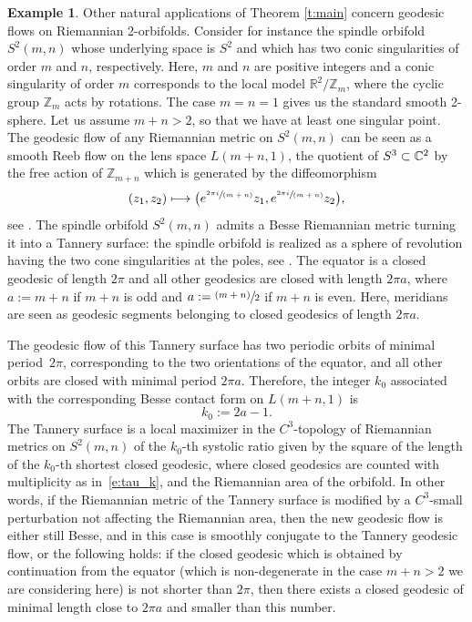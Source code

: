 \documentclass[JEP,XML,SOM,Unicode,published]{cedram}
\let\mathds\mathbb
\newcommand{\psfrac}[2]{\sfrac{(#1)}{#2}}
\newcommand{\spfrac}[2]{\sfrac{#1}{(#2)}}
\newcommand\mto{\mathchoice{\longmapsto}{\mapsto}{\mapsto}{\mapsto}}
\theoremstyle{definition}
\newtheorem{exm}[thm]{Example}
\newcommand{\Z}{\mathds{Z}}
\newcommand{\R}{\mathds{R}}
\begin{document}
\begin{exm}\label{exm:besse_spindle}
Other natural applications of Theorem \ref{t:main} concern geodesic flows on Riemannian 2-orbifolds. Consider for instance the spindle orbifold $S^2(m,n)$ whose underlying space is $S^2$ and which has two conic singularities of order $m$ and $n$, respectively. Here, $m$ and $n$ are positive integers and a conic singularity of order $m$ corresponds to the local model $\R^2/\Z_m$, where the cyclic group $\Z_m$ acts by rotations. The case $m=n=1$ gives us the standard smooth 2-sphere. Let us assume $m+n>2$, so that we have at least one singular point. The geodesic flow of any Riemannian metric on $S^2(m,n)$ can be seen as a smooth Reeb flow on the lens space $L(m+n,1)$, \ie the quotient of $S^3\subset \C^2$ by the free action of $\Z_{m+n}$ which is generated by the diffeomorphism
\[
(z_1,z_2) \mto \bigl( e^{\spfrac{2\pi i}{m+n}} z_1, e^{\spfrac{2\pi i}{m+n}} z_2 \bigr),
\]
see \cite{Lange:2020}. The spindle orbifold $S^2(m,n)$ admits a Besse Riemannian metric turning it into a Tannery surface: the spindle orbifold is realized as a sphere of revolution having the two cone singularities at the poles, see \cite[Chap.\,4]{Besse:1978pr}. The equator is a closed geodesic of length $2\pi$ and all other geodesics are closed with length $2\pi a$, where $a:= m+n$ if $m+n$ is odd and $a:= \psfrac{m+n}{2}$ if $m+n$ is even. Here, meridians are seen as geodesic segments belonging to closed geodesics of length $2\pi a$.

The geodesic flow of this Tannery surface has two periodic orbits of minimal period~$2\pi$, corresponding to the two orientations of the equator, and all other orbits are closed with minimal period $2\pi a$. Therefore, the integer $k_0$ associated with the corresponding Besse contact form on $L(m+n,1)$ is
\[
k_0 := 2a -1.
\]
The Tannery surface is a local maximizer in the $C^3$-topology of Riemannian metrics on $S^2(m,n)$ of the $k_0$-th systolic ratio given by the square of the length of the $k_0$\nobreakdash-th shortest closed geodesic, where closed geodesics are counted with multiplicity as in~\eqref{e:tau_k}, and the Riemannian area of the orbifold. In other words, if the Riemannian metric of the Tannery surface is modified by a $C^3$-small perturbation not affecting the Riemannian area, then the new geodesic flow is either still Besse, and in this case is smoothly conjugate to the Tannery geodesic flow, or the following holds: if the closed geodesic which is obtained by continuation from the equator (which is non-degenerate in the case $m+n>2$ we are considering here) is not shorter than $2\pi$, then there exists a closed geodesic of minimal length close to $2\pi a$ and smaller than this number.


\end{exm}
\end{document}
